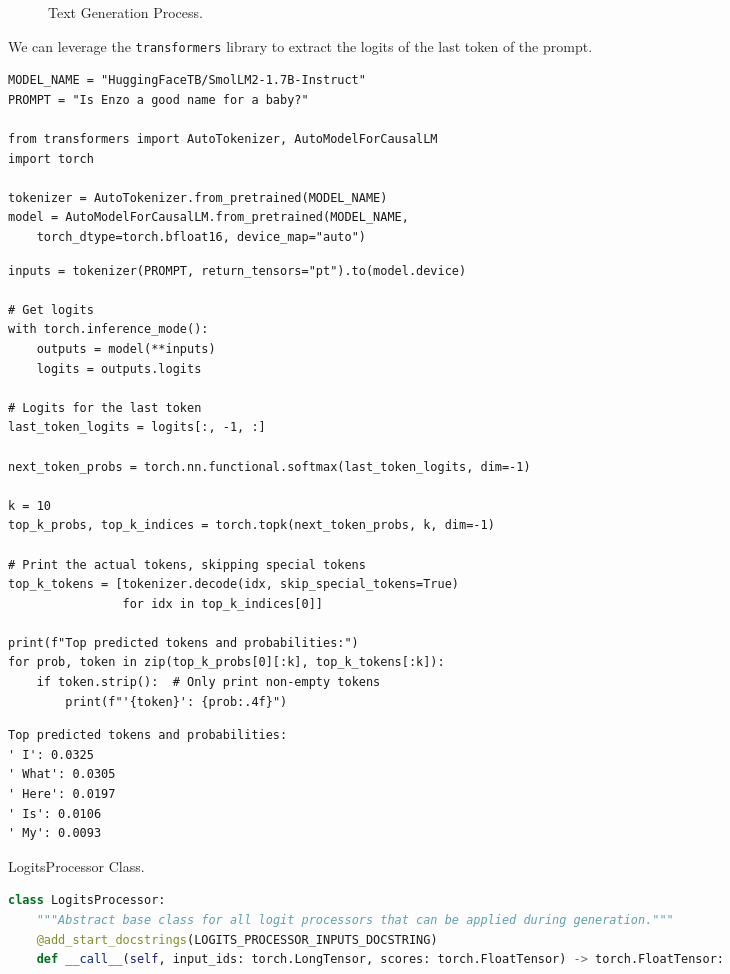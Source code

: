 \begin{figure}[h]
\centering

    \caption{Text Generation Process.}
    \label{fig:logit}
\end{figure}

We can leverage the \texttt{transformers} library to extract the logits of the last token of the prompt.

\begin{verbatim}
MODEL_NAME = "HuggingFaceTB/SmolLM2-1.7B-Instruct"
PROMPT = "Is Enzo a good name for a baby?"

from transformers import AutoTokenizer, AutoModelForCausalLM
import torch

tokenizer = AutoTokenizer.from_pretrained(MODEL_NAME)
model = AutoModelForCausalLM.from_pretrained(MODEL_NAME, 
    torch_dtype=torch.bfloat16, device_map="auto")
\end{verbatim}

\begin{verbatim}
inputs = tokenizer(PROMPT, return_tensors="pt").to(model.device)

# Get logits
with torch.inference_mode():
    outputs = model(**inputs)
    logits = outputs.logits

# Logits for the last token
last_token_logits = logits[:, -1, :]

next_token_probs = torch.nn.functional.softmax(last_token_logits, dim=-1)

k = 10
top_k_probs, top_k_indices = torch.topk(next_token_probs, k, dim=-1)

# Print the actual tokens, skipping special tokens
top_k_tokens = [tokenizer.decode(idx, skip_special_tokens=True) 
                for idx in top_k_indices[0]]

print(f"Top predicted tokens and probabilities:")
for prob, token in zip(top_k_probs[0][:k], top_k_tokens[:k]):
    if token.strip():  # Only print non-empty tokens
        print(f"'{token}': {prob:.4f}")
\end{verbatim}

\begin{verbatim}
Top predicted tokens and probabilities:
' I': 0.0325
' What': 0.0305
' Here': 0.0197
' Is': 0.0106
' My': 0.0093
\end{verbatim}

\begin{marginlisting}[-1.35cm]
	\caption{LogitsProcessor Class.}
    \label{lst:logit}
	\vspace{0.6cm}
	\begin{lstlisting}[language=Python,style=kaolstplain]
class LogitsProcessor:
    """Abstract base class for all logit processors that can be applied during generation."""
    @add_start_docstrings(LOGITS_PROCESSOR_INPUTS_DOCSTRING)
    def __call__(self, input_ids: torch.LongTensor, scores: torch.FloatTensor) -> torch.FloatTensor:
	\end{lstlisting}
\end{marginlisting}

